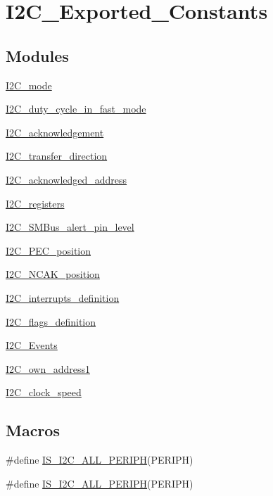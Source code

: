\hypertarget{group___i2_c___exported___constants}{}\section{I2\+C\+\_\+\+Exported\+\_\+\+Constants}
\label{group___i2_c___exported___constants}
\subsection*{Modules}
\begin{DoxyCompactItemize}
\item 
\hyperlink{group___i2_c__mode}{I2\+C\+\_\+mode}
\item 
\hyperlink{group___i2_c__duty__cycle__in__fast__mode}{I2\+C\+\_\+duty\+\_\+cycle\+\_\+in\+\_\+fast\+\_\+mode}
\item 
\hyperlink{group___i2_c__acknowledgement}{I2\+C\+\_\+acknowledgement}
\item 
\hyperlink{group___i2_c__transfer__direction}{I2\+C\+\_\+transfer\+\_\+direction}
\item 
\hyperlink{group___i2_c__acknowledged__address}{I2\+C\+\_\+acknowledged\+\_\+address}
\item 
\hyperlink{group___i2_c__registers}{I2\+C\+\_\+registers}
\item 
\hyperlink{group___i2_c___s_m_bus__alert__pin__level}{I2\+C\+\_\+\+S\+M\+Bus\+\_\+alert\+\_\+pin\+\_\+level}
\item 
\hyperlink{group___i2_c___p_e_c__position}{I2\+C\+\_\+\+P\+E\+C\+\_\+position}
\item 
\hyperlink{group___i2_c___n_c_a_k__position}{I2\+C\+\_\+\+N\+C\+A\+K\+\_\+position}
\item 
\hyperlink{group___i2_c__interrupts__definition}{I2\+C\+\_\+interrupts\+\_\+definition}
\item 
\hyperlink{group___i2_c__flags__definition}{I2\+C\+\_\+flags\+\_\+definition}
\item 
\hyperlink{group___i2_c___events}{I2\+C\+\_\+\+Events}
\item 
\hyperlink{group___i2_c__own__address1}{I2\+C\+\_\+own\+\_\+address1}
\item 
\hyperlink{group___i2_c__clock__speed}{I2\+C\+\_\+clock\+\_\+speed}
\end{DoxyCompactItemize}
\subsection*{Macros}
\begin{DoxyCompactItemize}
\item 
\#define \hyperlink{group___i2_c___exported___constants_ga2e57489a40603d6ab7ff115b94eeb303}{I\+S\+\_\+\+I2\+C\+\_\+\+A\+L\+L\+\_\+\+P\+E\+R\+I\+PH}(P\+E\+R\+I\+PH)
\item 
\#define \hyperlink{group___i2_c___exported___constants_ga2e57489a40603d6ab7ff115b94eeb303}{I\+S\+\_\+\+I2\+C\+\_\+\+A\+L\+L\+\_\+\+P\+E\+R\+I\+PH}(P\+E\+R\+I\+PH)
\end{DoxyCompactItemize}


